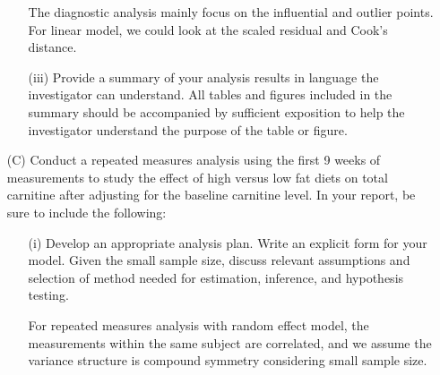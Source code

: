 \begin{itemize}
\begin{itemize}
The diagnostic analysis mainly focus on the influential and outlier points. For linear model, we could look at the scaled residual and Cook's distance.


													
													\vspace{0.2cm}
												  \item[(iii)] Provide a summary of your analysis results in language the investigator can understand. All tables 
																			 and figures included in the summary should be accompanied by sufficient exposition to help the 
																			 investigator understand the purpose of the table or figure. 		
											   \end{itemize}
								
								\vspace{0.2cm}
								\item[(C)] Conduct a repeated measures analysis using the first 9 weeks of measurements to study the effect of high 
													 versus low fat diets on total carnitine after adjusting for the baseline carnitine level. In your report, 
													 be sure to include the following:
							
													\begin{itemize}
													\vspace{0.2cm}
													\item[(i)] Develop an appropriate analysis plan. Write an explicit form for your model.
																		 Given the small sample size, discuss relevant assumptions and selection of method needed for estimation, inference, and hypothesis testing.

For repeated measures analysis with random effect model, the measurements within the same subject are correlated, and we assume the variance structure is compound symmetry considering small sample size. 


\end{itemize}
\end{itemize}
